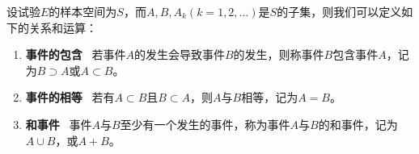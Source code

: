 \documentclass[UTF8]{ctexart}
\begin{document}
		设试验$E$的样本空间为$S$，而$A,B,A_k(k=1,2,\dots)$是$S$的子集，则我们可以定义如下的关系和运算：
		\begin{enumerate}
			\item \textbf{事件的包含} \ 若事件$A$的发生会导致事件$B$的发生，则称事件$B$包含事件$A$，记为$B \supset A$或$A \subset B$。
			\item \textbf{事件的相等} \ 若有$A \subset B$且$B \subset A$，则$A$与$B$相等，记为$A = B$。
			\item \textbf{和事件} \ 事件$A$与$B$至少有一个发生的事件，称为事件$A$与$B$的和事件，记为$A \cup B$，或$A + B$。
 		\end{enumerate}
		
\end{document}
